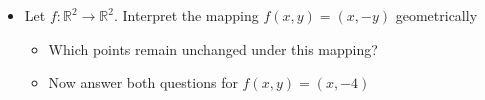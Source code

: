 \documentclass[10pt]{seminar}
\begin{document}
\begin{slide}
\begin{itemize}
\begin{itemize}
\end{itemize}

\newslide

\item[3.4.1] Let $f:\mathbb{R}^2\rightarrow \mathbb{R}^2$. Interpret the mapping $f(x, y)=(x, -y)$ geometrically
\begin{itemize}

\item Which points remain unchanged under this mapping? %

\item Now answer both questions for $f(x, y)=(x, -4)$ %

\end{itemize}


\end{itemize}

\end{slide}
\end{document}
